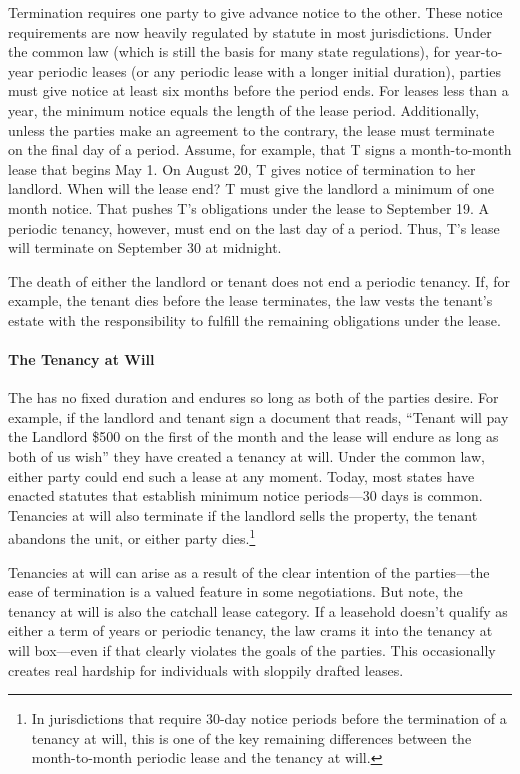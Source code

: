 Termination requires one party to give advance notice to the other.  These
notice requirements are now heavily regulated by statute in most jurisdictions.
 Under the common law (which is still the basis for many state regulations),
for year-to-year periodic leases (or any periodic lease with a longer initial
duration), parties must give notice at least six months before the period ends.
 For leases less than a year, the minimum notice equals the length of the lease
period.  Additionally, unless the parties make an agreement to the contrary,
the lease must terminate on the final day of a period.  Assume, for example,
that T signs a month-to-month lease that begins May 1.  On August 20, T gives
notice of termination to her landlord.  When will the lease end?  T must give
the landlord a minimum of one month notice.  That pushes T's obligations under
the lease to September 19.  A periodic tenancy, however, must end on the last
day of a period.  Thus, T's lease will terminate on September 30 at midnight. 

The death of either the landlord or tenant does not end a periodic tenancy.  If,
for example, the tenant dies before the lease terminates, the law vests the
tenant's estate with the responsibility to fulfill the remaining obligations
under the lease.  

\paragraph{The Tenancy at Will}

The  has no fixed duration and endures so long as both
of the parties desire.  For example, if the landlord and tenant sign a document
that reads, ``Tenant will pay the Landlord \$500 on the first of the month and
the lease will endure as long as both of us wish'' they have created a tenancy
at will.  Under the common law, either party could end such a lease at any
moment.  Today, most states have enacted statutes that establish minimum notice
periods---30 days is common.  Tenancies at will also terminate if the landlord
sells the property, the tenant abandons the unit, or either party
dies.\footnote{In jurisdictions that require 30-day notice periods before the
termination of a tenancy at will, this is one of the key remaining differences
between the month-to-month periodic lease and the tenancy at will.}

Tenancies at will can arise as a result of the clear intention of the
parties---the ease of termination is a valued feature in some negotiations. 
But note, the tenancy at will is also the catchall lease category.  If a
leasehold doesn't qualify as either a term of years or periodic tenancy, the
law crams it into the tenancy at will box---even if that clearly violates the
goals of the parties.  This occasionally creates real hardship for individuals
with sloppily drafted leases.  

